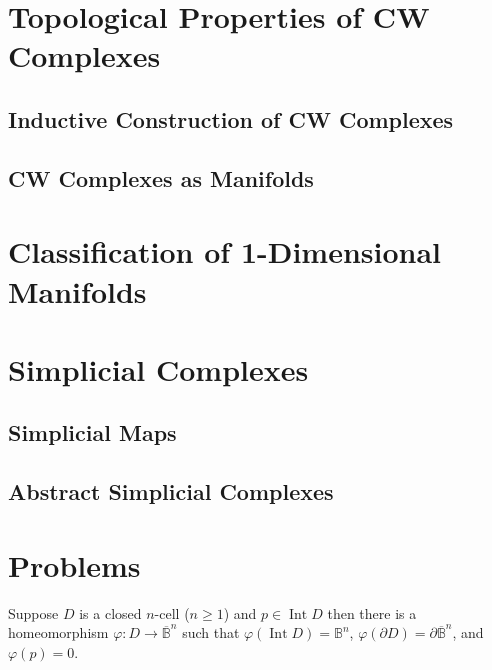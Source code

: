 \section{Topological Properties of CW Complexes}

\subsection{Inductive Construction of CW Complexes}

\subsection{CW Complexes as Manifolds}

\section{Classification of 1-Dimensional Manifolds}

\section{Simplicial Complexes}

\subsection{Simplicial Maps}

\subsection{Abstract Simplicial Complexes}

\section*{Problems}

\begin{note}\label{note:closed-cell-homeomorphism}
	Suppose $D$ is a closed $n$-cell ($n\geq 1$) and $p\in \operatorname{Int} D$ then there is a homeomorphism $\varphi: D \to \overline{\mathbb{B}}^{n}$ such that $\varphi(\operatorname{Int} D) = \mathbb{B}^{n}$, $\varphi(\partial D) = \partial \overline{\mathbb{B}}^{n}$, and $\varphi(p) = 0$.
\end{note}

